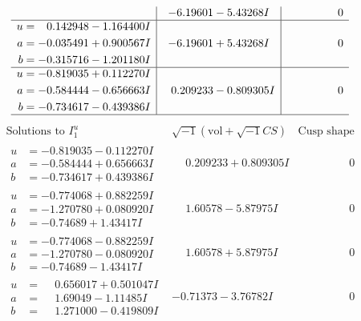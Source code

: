 \documentclass[1p]{elsarticle_modified}
\theoremstyle{definition}
\newcommand{\I}{\sqrt{-1}}
\begin{document}
$$\begin{array}{c|c|c}
 & -6.19601 - 5.43268 I & \phantom{-0.000000 } 0 \\ \hline\begin{aligned}
u &= \phantom{-}0.142948 - 1.164400 I \\
a &= -0.035491 + 0.900567 I \\
b &= -0.315716 - 1.201180 I\end{aligned}
 & -6.19601 + 5.43268 I & \phantom{-0.000000 } 0 \\ \hline\begin{aligned}
u &= -0.819035 + 0.112270 I \\
a &= -0.584444 - 0.656663 I \\
b &= -0.734617 - 0.439386 I\end{aligned}
 & \phantom{-}0.209233 - 0.809305 I & \phantom{-0.000000 } 0\\
 \hline 
 \end{array}$$\newpage$$\begin{array}{c|c|c}  
\text{Solutions to }I^u_{1}& \I (\text{vol} + \sqrt{-1}CS) & \text{Cusp shape}\\
 \hline 
\begin{aligned}
u &= -0.819035 - 0.112270 I \\
a &= -0.584444 + 0.656663 I \\
b &= -0.734617 + 0.439386 I\end{aligned}
 & \phantom{-}0.209233 + 0.809305 I & \phantom{-0.000000 } 0 \\ \hline\begin{aligned}
u &= -0.774068 + 0.882259 I \\
a &= -1.270780 + 0.080920 I \\
b &= -0.74689 + 1.43417 I\end{aligned}
 & \phantom{-}1.60578 - 5.87975 I & \phantom{-0.000000 } 0 \\ \hline\begin{aligned}
u &= -0.774068 - 0.882259 I \\
a &= -1.270780 - 0.080920 I \\
b &= -0.74689 - 1.43417 I\end{aligned}
 & \phantom{-}1.60578 + 5.87975 I & \phantom{-0.000000 } 0 \\ \hline\begin{aligned}
u &= \phantom{-}0.656017 + 0.501047 I \\
a &= \phantom{-}1.69049 - 1.11485 I \\
b &= \phantom{-}1.271000 - 0.419809 I\end{aligned}
 & -0.71373 - 3.76782 I & \phantom{-0.000000 } 0 \\ \hline\begin{aligned}

\end{aligned}
\end{array}$$
\end{document}
